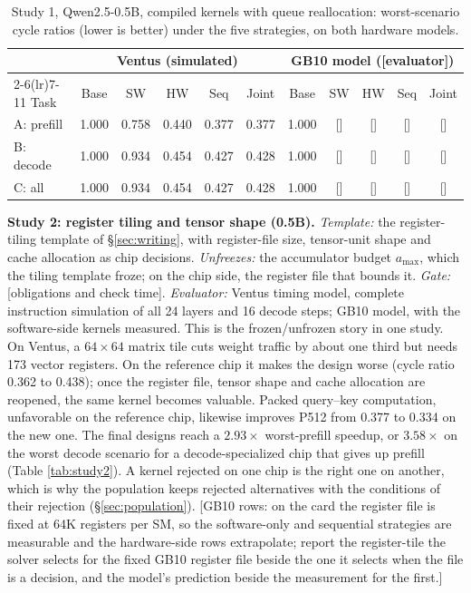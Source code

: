 \documentclass[11pt]{article}
\newcommand{\pending}[1]{\textcolor{red!65!black}{[#1]}}
\begin{document}
\begin{table}[tb]
\small
\centering
\begin{tabular}{@{}l ccccc ccccc@{}}
\toprule
 & \multicolumn{5}{c}{Ventus (simulated)} & \multicolumn{5}{c}{GB10 model (\pending{evaluator})} \\
\cmidrule(lr){2-6}\cmidrule(lr){7-11}
Task & Base & SW & HW & Seq & Joint & Base & SW & HW & Seq & Joint \\
\midrule
A: prefill & 1.000 & 0.758 & 0.440 & 0.377 & 0.377 & 1.000 & \pending{} & \pending{} & \pending{} & \pending{} \\
B: decode & 1.000 & 0.934 & 0.454 & 0.427 & 0.428 & 1.000 & \pending{} & \pending{} & \pending{} & \pending{} \\
C: all & 1.000 & 0.934 & 0.454 & 0.427 & 0.428 & 1.000 & \pending{} & \pending{} & \pending{} & \pending{} \\
\bottomrule
\end{tabular}
\caption{Study 1, Qwen2.5-0.5B, compiled kernels with queue reallocation: worst-scenario cycle ratios (lower is better) under the five strategies, on both hardware models.}
\label{tab:study1}
\end{table}

\textbf{Study 2: register tiling and tensor shape (0.5B).} \emph{Template:} the register-tiling template of §\ref{sec:writing}, with register-file size, tensor-unit shape and cache allocation as chip decisions. \emph{Unfreezes:} the accumulator budget \(a_{\max}\), which the tiling template froze; on the chip side, the register file that bounds it. \emph{Gate:} \pending{obligations and check time}. \emph{Evaluator:} Ventus timing model, complete instruction simulation of all 24 layers and 16 decode steps; GB10 model, with the software-side kernels measured. This is the frozen/unfrozen story in one study. On Ventus, a \(64\times64\) matrix tile cuts weight traffic by about one third but needs 173 vector registers. On the reference chip it makes the design worse (cycle ratio 0.362 to 0.438); once the register file, tensor shape and cache allocation are reopened, the same kernel becomes valuable. Packed query--key computation, unfavorable on the reference chip, likewise improves P512 from 0.377 to 0.334 on the new one. The final designs reach a \(2.93\times\) worst-prefill speedup, or \(3.58\times\) on the worst decode scenario for a decode-specialized chip that gives up prefill (Table \ref{tab:study2}). A kernel rejected on one chip is the right one on another, which is why the population keeps rejected alternatives with the conditions of their rejection (§\ref{sec:population}). \pending{GB10 rows: on the card the register file is fixed at 64K registers per SM, so the software-only and sequential strategies are measurable and the hardware-side rows extrapolate; report the register-tile the solver selects for the fixed GB10 register file beside the one it selects when the file is a decision, and the model's prediction beside the measurement for the first.}
\end{document}
